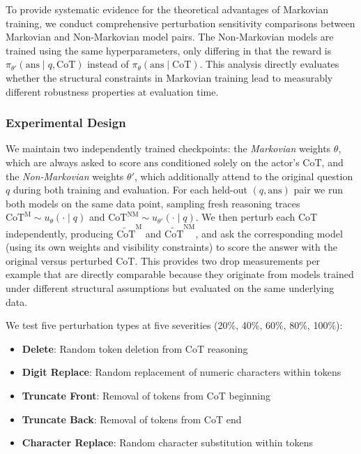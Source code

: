 \documentclass{article} %
\begin{document}
To provide systematic evidence for the theoretical advantages of Markovian training, we conduct comprehensive perturbation sensitivity comparisons between Markovian and Non-Markovian model pairs. The Non-Markovian models are trained using the same hyperparameters, only differing in that the reward is $\pi_{\theta'}(\text{ans}\mid q, \text{CoT})$ instead of $\pi_\theta(\text{ans} \mid \text{CoT})$. This analysis directly evaluates whether the structural constraints in Markovian training lead to measurably different robustness properties at evaluation time.

\subsubsection{Experimental Design}
We maintain two independently trained checkpoints: the \emph{Markovian} weights $\theta$, which are always asked to score $\text{ans}$ conditioned solely on the actor's CoT, and the \emph{Non-Markovian} weights $\theta'$, which additionally attend to the original question $q$ during both training and evaluation. For each held-out $(q, \text{ans})$ pair we run both models on the same data point, sampling fresh reasoning traces $\text{CoT}^{\text{M}} \sim u_\theta(\cdot \mid q)$ and $\text{CoT}^{\text{NM}} \sim u_{\theta'}(\cdot \mid q)$. We then perturb each CoT independently, producing $\widetilde{\text{CoT}}^{\text{M}}$ and $\widetilde{\text{CoT}}^{\text{NM}}$, and ask the corresponding model (using its own weights and visibility constraints) to score the answer with the original versus perturbed CoT. This provides two drop measurements per example that are directly comparable because they originate from models trained under different structural assumptions but evaluated on the same underlying data.

We test five perturbation types at five severities (20\%, 40\%, 60\%, 80\%, 100\%):
\begin{itemize}
    \item \textbf{Delete}: Random token deletion from CoT reasoning
    \item \textbf{Digit Replace}: Random replacement of numeric characters within tokens
    \item \textbf{Truncate Front}: Removal of tokens from CoT beginning  
    \item \textbf{Truncate Back}: Removal of tokens from CoT end
    \item \textbf{Character Replace}: Random character substitution within tokens
\end{itemize}
\end{document}
